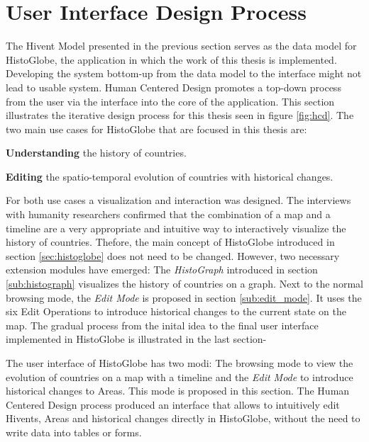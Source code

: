 
\section{User Interface Design Process} %
\label{sec:user_interface_design_process}

The Hivent Model presented in the previous section serves as the data model for HistoGlobe, the application in which the work of this thesis is implemented. Developing the system bottom-up from the data model to the interface might not lead to usable system. Human Centered Design promotes a top-down process from the user via the interface into the core of the application. This section illustrates the iterative design process for this thesis seen in figure \ref{fig:hcd}. The two main use cases for HistoGlobe that are focused in this thesis are:

\begin{compactenum}
  \item \textbf{Understanding} the history of countries.
  \item \textbf{Editing} the spatio-temporal evolution of countries with historical changes.
\end{compactenum}

For both use cases a visualization and interaction was designed. The interviews with humanity researchers confirmed that the combination of a map and a timeline are a very appropriate and intuitive way to interactively visualize the history of countries. Thefore, the main concept of HistoGlobe introduced in section \ref{sec:histoglobe} does not need to be changed. However, two necessary extension modules have emerged: The \emph{HistoGraph} introduced in section \ref{sub:histograph} visualizes the history of countries on a graph. Next to the normal browsing mode, the \emph{Edit Mode} is proposed in section \ref{sub:edit_mode}. It uses the six Edit Operations to introduce historical changes to the current state on the map. The gradual process from the inital idea to the final user interface implemented in HistoGlobe is illustrated in the last section-

The user interface of HistoGlobe has two modi: The browsing mode to view the evolution of countries on a map with a timeline and the \emph{Edit Mode} to introduce historical changes to Areas. This mode is proposed in this section. The Human Centered Design process produced an interface that allows to intuitively edit Hivents, Areas and historical changes directly in HistoGlobe, without the need to write data into tables or forms.

